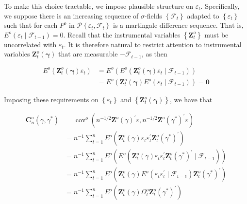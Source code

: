 \documentclass[10pt]{article}
\begin{document}
To make this choice tractable, we impose plausible structure on $\varepsilon_{t}$. Specifically, we suppose there is an increasing sequence of $\sigma$-fields $\left\{\mathcal{F}_{t}\right\}$ adapted to $\left\{\varepsilon_{t}\right\}$ such that for each $P^{o}$ in $\mathcal{P}\left\{\varepsilon_{t}, \mathcal{F}_{t}\right\}$ is a martingale difference sequence. That is, $E^{o}\left(\varepsilon_{t} \mid \mathcal{F}_{t-1}\right)=0$. Recall that the instrumental variables $\left\{\mathbf{Z}_{t}^{o}\right\}$ must be uncorrelated with $\varepsilon_{t}$. It is therefore natural to restrict attention to instrumental variables $\mathbf{Z}_{t}^{o}(\boldsymbol{\gamma})$ that are measurable $-\mathcal{F}_{t-1}$, as then

$$
\begin{aligned}
E^{o}\left(\mathbf{Z}_{t}^{o}(\boldsymbol{\gamma}) \varepsilon_{t}\right) & =E^{o}\left(E^{o}\left(\mathbf{Z}_{t}^{o}(\boldsymbol{\gamma}) \varepsilon_{t} \mid \mathcal{F}_{t-1}\right)\right) \\
& =E^{o}\left(\mathbf{Z}_{t}^{o}(\boldsymbol{\gamma}) E^{o}\left(\varepsilon_{t} \mid \mathcal{F}_{t-1}\right)\right)=\mathbf{0}
\end{aligned}
$$

Imposing these requirements on $\left\{\varepsilon_{t}\right\}$ and $\left\{\mathbf{Z}_{t}^{o}(\boldsymbol{\gamma})\right\}$, we have that

$$
\begin{aligned}
\mathbf{C}_{n}^{o}\left(\gamma, \gamma^{*}\right) & =\operatorname{cov}^{o}\left(n^{-1 / 2} \mathbf{Z}^{o}(\gamma)^{\prime} \varepsilon, n^{-1 / 2} \mathbf{Z}^{o}\left(\gamma^{*}\right)^{\prime} \varepsilon\right) \\
& =n^{-1} \sum_{t=1}^{n} E^{o}\left(\mathbf{Z}_{t}^{o}(\gamma) \varepsilon_{t} \varepsilon_{t}^{\prime} \mathbf{Z}_{t}^{o}\left(\gamma^{*}\right)^{\prime}\right) \\
& =n^{-1} \sum_{t=1}^{n} E^{o}\left(E^{o}\left(\mathbf{Z}_{t}^{o}(\gamma) \varepsilon_{t} \varepsilon_{t}^{\prime} \mathbf{Z}_{t}^{o}\left(\gamma^{*}\right)^{\prime} \mid \mathcal{F}_{t-1}\right)\right) \\
& =n^{-1} \sum_{t=1}^{n} E^{o}\left(\mathbf{Z}_{t}^{o}(\gamma) E^{o}\left(\varepsilon_{t} \varepsilon_{t}^{\prime} \mid \mathcal{F}_{t-1}\right) \mathbf{Z}_{t}^{o}\left(\gamma^{*}\right)^{\prime}\right) \\
& =n^{-1} \sum_{t=1}^{n} E^{o}\left(\mathbf{Z}_{t}^{o}(\gamma) \Omega_{t}^{o} \mathbf{Z}_{t}^{o}\left(\gamma^{*}\right)^{\prime}\right)
\end{aligned}
$$
\end{document}
